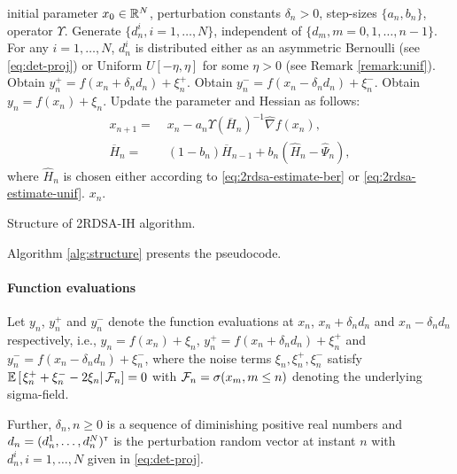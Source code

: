 \documentclass[letterpaper, 10 pt, conference]{ieeeconf}  %
\begin{document}
\begin{algorithm}[t]
\begin{algorithmic}
initial parameter $x_0 \in \mathbb{R}^N$, perturbation constants $\delta_n>0$, step-sizes $\{a_n, b_n\}$, operator $\Upsilon$.
	\State Generate $\{d_n^{i}, i=1,\ldots,N\}$, independent of $\{d_m, m=0,1,\ldots,n-1\}$. 
	\State For any $i=1,\ldots,N$, $d_n^{i}$ is distributed either as an asymmetric Bernoulli (see \eqref{eq:det-proj}) or Uniform $U[-\eta,\eta]$ for some $\eta >0$ (see Remark \ref{remark:unif}). 
	\PEval
	    \State Obtain $y_n^+ = f(x_n+\delta_n d_n) + \xi_n^+$.
  \EndPEval
	    \PEvalPrime
	    \State Obtain $y_n^- = f(x_n-\delta_n d_n) + \xi_n^-$.
	    \EndPEvalPrime
	    	    \PEvalPrimeDouble
	    \State Obtain $y_n = f(x_n) + \xi_n$.
	    \EndPEvalPrimeDouble
	    \PImpNewton
		\State Update the parameter and Hessian as follows:
		\begin{align*}
		x_{n+1} = & \; x_n - a_n \Upsilon(\overline H_n)^{-1}\widehat\nabla f(x_n), \\
\overline H_n = &\; (1-b_{n})  \overline H_{n-1} + b_{n} ( \widehat H_n - \widehat \Psi_n),
\end{align*}
where $\widehat H_n$ is chosen either according to \eqref{eq:2rdsa-estimate-ber} or \eqref{eq:2rdsa-estimate-unif}.
		\EndPImpNewton
\EndFor
{} $x_n.$
\end{algorithmic}
\caption{Structure of 2RDSA-IH algorithm.}
\label{alg:structure}
\end{algorithm}

Algorithm \ref{alg:structure} presents the pseudocode.
\paragraph{\textbf{Function evaluations}}
Let $y_n$, $y_n^+$ and $y_n^-$ denote the function evaluations at $x_n$, $x_n+\delta_n d_n$ and $x_n - \delta_n d_n$ respectively, i.e., 
$y_n = f(x_n) + \xi_n$, $y_n^+ = f(x_n+\delta_n d_n) + \xi_n^+$ and 
$y_n^- = f(x_n-\delta_n d_n) + \xi_n^-$,
where the noise terms $\xi_n, \xi_n^+, \xi_n^-$ satisfy $\mathbb{E}\left[\left.\xi_n^+ + \xi_n^- - 2\xi_n \right| \mathcal{F}_n\right] = 0$ with $\mathcal{F}_n = \sigma(x_m,m\le n)$ denoting the underlying sigma-field.

Further, $\delta_n, n\geq 0$ is a sequence of diminishing positive real numbers and $d_n = (d_n^1,\ldots,d_n^N)^\mathsf{\scriptscriptstyle T}$ is the perturbation random vector at instant $n$ with $d_n^i,i=1,\ldots,N$ given in \eqref{eq:det-proj}.  
\end{document}
